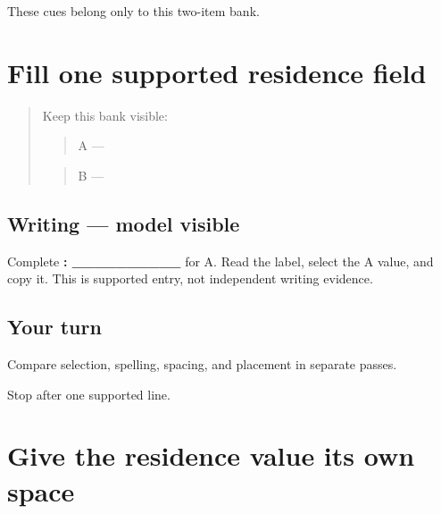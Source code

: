 \begin{tcolorbox}[breakable,colback=teal!4,colframe=teal!35!black,title={Before you move on}]
These cues belong only to this two-item bank.
\end{tcolorbox}
\section[\texorpdfstring{\pa{ਰਿਹਾਇਸ਼}: \_\_\_\_\_\_\_\_\_\_ (residence field)}{ਰਿਹਾਇਸ਼: \_\_\_\_\_\_\_\_\_\_ (residence field)}]{Fill one supported residence field}

\label{lesson:PA-W04-residence-supported}



\begin{quote}
Keep this bank visible:

\begin{quote}
A — \textbf{}
\end{quote}

\begin{quote}
B — \textbf{}
\end{quote}
\end{quote}

\subsection*{Writing — model visible}
Complete \textbf{: \_\_\_\_\_\_\_\_\_\_} for A. Read the label, select the A value, and copy it. This is supported entry, not independent writing evidence.

\subsection*{Your turn}
Compare selection, spelling, spacing, and placement in separate passes.

\begin{tcolorbox}[breakable,colback=teal!4,colframe=teal!35!black,title={Before you move on}]
Stop after one supported line.
\end{tcolorbox}
\section[\texorpdfstring{\pa{ਰਿਹਾਇਸ਼}: \pa{ਪਿੰਡ} (residence field spacing)}{ਰਿਹਾਇਸ਼: ਪਿੰਡ (residence field spacing)}]{Give the residence value its own space}

\label{lesson:PA-W04-residence-spacing}



